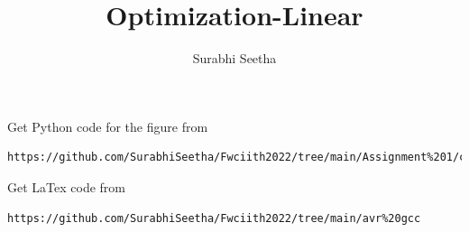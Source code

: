 \documentclass[journal,12pt,twocolumn]{IEEEtran}
\begin{document}
\makeatother
\let\StandardTheFigure\thefigure
\let\vec\mathbf
\renewcommand{\thefigure}{\theproblem}
\def\putbox#1#2#3{\makebox[0in][l]{\makebox[#1][l]{}\raisebox{\baselineskip}[0in][0in]{\raisebox{#2}[0in][0in]{#3}}}}
     \def\rightbox#1{\makebox[0in][r]{#1}}
     \def\centbox#1{\makebox[0in]{#1}}
     \def\topbox#1{\raisebox{-\baselineskip}[0in][0in]{#1}}
     \def\midbox#1{\raisebox{-0.5\baselineskip}[0in][0in]{#1}}
\vspace{3cm}
\title{\textbf{Optimization-Linear} }
\author{Surabhi Seetha}
\maketitle
\newpage
\bigskip
\renewcommand{\thefigure}{\theenumi}
\renewcommand{\thetable}{\theenumi}
Get Python code for the figure from 
\begin{lstlisting}
https://github.com/SurabhiSeetha/Fwciith2022/tree/main/Assignment%201/codes/src
\end{lstlisting}
Get LaTex code from
\begin{lstlisting}
https://github.com/SurabhiSeetha/Fwciith2022/tree/main/avr%20gcc
\end{lstlisting}
%
\end{document}
